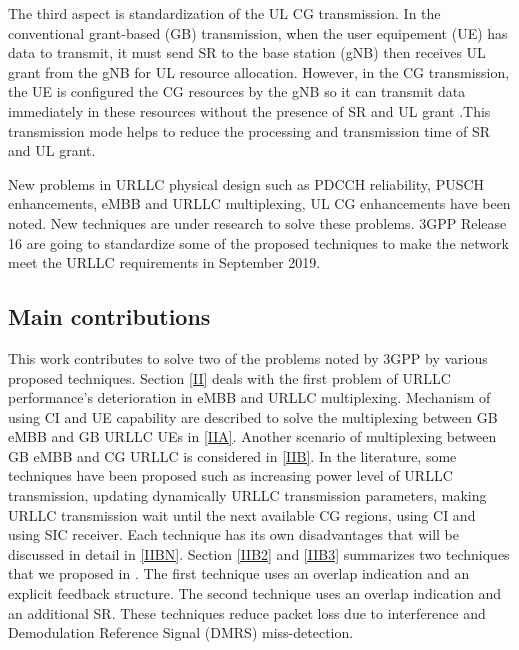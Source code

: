 \documentclass{ieeeaccess}
\begin{document}
The third aspect is standardization of the UL CG transmission. In the conventional grant-based (GB) transmission, when the user equipement (UE) has data to transmit, it must send SR to the base station (gNB) then receives UL grant from the gNB for UL resource allocation. However, in the CG transmission, the UE is configured the CG resources by the gNB so it can transmit data immediately in these resources without the presence of SR and UL grant \cite{ref5}.This transmission mode helps to reduce the processing and transmission time of SR and UL grant. 

New problems in URLLC physical design such as PDCCH reliability, PUSCH enhancements, eMBB and URLLC multiplexing, UL CG enhancements have been noted. New techniques are under research to solve these problems. 3GPP Release 16 are going to standardize some of the proposed techniques to make the network meet the URLLC requirements in September 2019.

\subsection{Main contributions}

This work contributes to solve two of the problems noted by 3GPP by various proposed techniques. Section \ref{II} deals with the first problem of URLLC performance's deterioration in eMBB and URLLC multiplexing. Mechanism of using CI and UE capability are described to solve the multiplexing between GB eMBB and GB URLLC UEs in \ref{IIA}. Another scenario of multiplexing between GB eMBB and CG URLLC is considered in \ref{IIB}. In the literature, some techniques have been proposed such as increasing power level of URLLC transmission, updating dynamically URLLC transmission parameters, making URLLC transmission wait until the next available CG regions, using CI and using SIC receiver. Each technique has its own disadvantages that will be discussed in detail in \ref{IIBN}. Section \ref{IIB2} and \ref{IIB3} summarizes two techniques that we proposed in \cite{ad99}. The first technique uses an overlap indication and an explicit feedback structure. The second technique uses an overlap indication and an additional SR. These techniques reduce packet loss due to interference and Demodulation Reference Signal (DMRS) miss-detection. 
\end{document}
